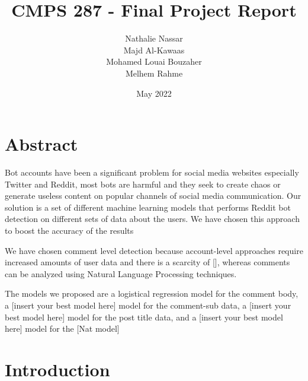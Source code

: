 \documentclass{article}
\title{CMPS 287 - Final Project Report}
\author{Nathalie Nassar \\Majd Al-Kawaas\\ Mohamed Louai Bouzaher\\ Melhem Rahme}
\date{May 2022}
\begin{document}
\maketitle

\section{Abstract}
Bot accounts have been a significant problem for social media websites especially Twitter and Reddit, most bots are harmful and they seek to create chaos or generate useless content on popular channels of social media communication. Our solution is a set of different machine learning models that performs Reddit bot detection 
on different sets of data about the users. We have chosen this approach to boost the accuracy of the results

We have chosen comment level detection because account-level approaches require increased amounts of user data and there is a scarcity of [], whereas comments can be analyzed using Natural Language Processing techniques.

The models we proposed are a logistical regression model for the comment body, a [insert your best model here] model for the comment-sub data, a [insert your best model here] model for the post title data, and a [insert your best model here] model for the [Nat model]

\section{Introduction}
\end{document}
